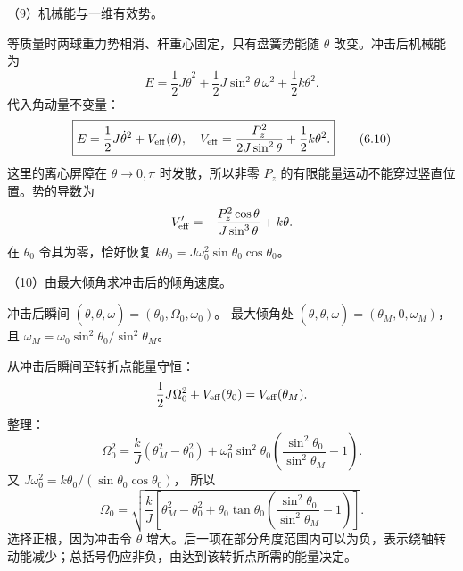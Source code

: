 \documentclass[12pt,a4paper,fontset=fandol]{ctexart}
\begin{document}
（9）机械能与一维有效势。

等质量时两球重力势相消、杆重心固定，只有盘簧势能随 \(\theta\)
改变。冲击后机械能为 \[
E=\frac12J\dot\theta^2+\frac12J\sin^2\theta\,\omega^2
+\frac12k\theta^2.
\] 代入角动量不变量： \[
\boxed{E=\frac12J\dot\theta^2+V_{\rm eff}(\theta),
\quad V_{\rm eff}=\frac{P_z^2}{2J\sin^2\theta}
+\frac12k\theta^2.}\tag{6.10}
\] 这里的离心屏障在 \(\theta\to0,\pi\) 时发散，所以非零 \(P_z\)
的有限能量运动不能穿过竖直位置。势的导数为 \[
V_{\rm eff}'=-\frac{P_z^2\cos\theta}{J\sin^3\theta}+k\theta.
\] 在 \(\theta_0\) 令其为零，恰好恢复
\(k\theta_0=J\omega_0^2\sin\theta_0\cos\theta_0\)。

\begin{center}
\begin{minipage}{\linewidth}
\centering\begingroup
{}
\ifdim\wd\diagrambox>.88\linewidth
\sbox{\diagrambox}{\resizebox{.88\linewidth}{!}{\usebox{\diagrambox}}}
\fi
\ifdim\ht\diagrambox>.40\textheight
\resizebox{!}{.40\textheight}{\usebox{\diagrambox}}
\else\usebox{\diagrambox}\fi
\par{}
\endgroup\end{minipage}
\end{center}

（10）由最大倾角求冲击后的倾角速度。

冲击后瞬间 \((\theta,\dot\theta,\omega)=(\theta_0,\Omega_0,\omega_0)\)。
最大倾角处 \((\theta,\dot\theta,\omega)=(\theta_M,0,\omega_M)\)，且
\(\omega_M=\omega_0\sin^2\theta_0/\sin^2\theta_M\)。

从冲击后瞬间至转折点能量守恒： \[
\frac12J\Omega_0^2+V_{\rm eff}(\theta_0)
=V_{\rm eff}(\theta_M).
\] 整理： \[
\Omega_0^2=
\frac{k}{J}(\theta_M^2-\theta_0^2)
+\omega_0^2\sin^2\theta_0
\left(\frac{\sin^2\theta_0}{\sin^2\theta_M}-1\right).
\] 又 \(J\omega_0^2=k\theta_0/(\sin\theta_0\cos\theta_0)\)， 所以 \[
\boxed{\Omega_0=
\sqrt{\frac{k}{J}
\left[
\theta_M^2-\theta_0^2+
\theta_0\tan\theta_0
\left(\frac{\sin^2\theta_0}{\sin^2\theta_M}-1\right)
\right]}.}\tag{6.11}
\] 选择正根，因为冲击令 \(\theta\)
增大。后一项在部分角度范围内可以为负，表示绕轴转动能减少；总括号仍应非负，由达到该转折点所需的能量决定。
\end{document}

